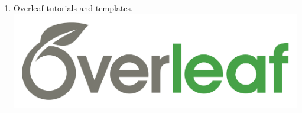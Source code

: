 \documentclass{article} %
\begin{document}
\begin{enumerate}
    \item Overleaf tutorials and templates.\\
        \href{https://www.overleaf.com/learn/latex/Tutorials}{\includegraphics[scale=0.2]{overleaf2.png}}%
    
         
\end{enumerate}

\newpage %

\end{document}
